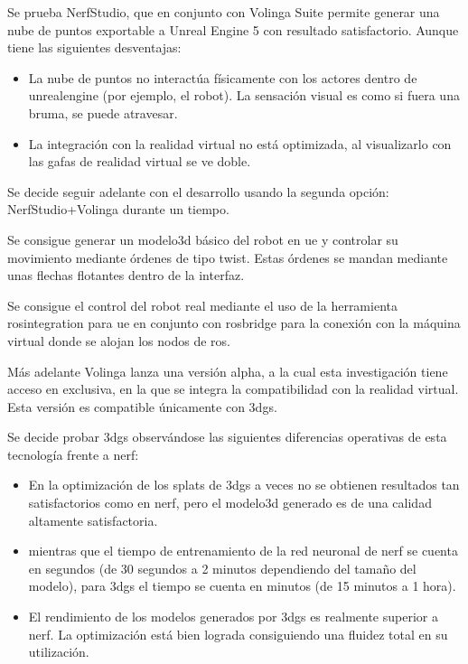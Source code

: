 \documentclass[a4paper, 12pt, spanish, twoside]{article}
\begin{document}
Se prueba NerfStudio, que en conjunto con Volinga Suite permite generar una nube de puntos exportable a Unreal Engine 5 con resultado satisfactorio. Aunque tiene las siguientes desventajas: 

\begin{itemize} 
\item La nube de puntos no interactúa físicamente con los \gls{actores} dentro de \gls{unrealengine} (por ejemplo, el robot). La sensación visual es como si fuera una bruma, se puede atravesar. 

\item La integración con la realidad virtual no está optimizada, al visualizarlo con las gafas de realidad virtual se ve doble. 
\end{itemize} 

Se decide seguir adelante con el desarrollo usando la segunda opción: NerfStudio+Volinga durante un tiempo. 

Se consigue generar un \gls{modelo3d} básico del robot en \acrshort{ue} y controlar su movimiento mediante órdenes de tipo \gls{twist}. Estas órdenes se mandan mediante unas flechas flotantes dentro de la interfaz. 

Se consigue el control del robot real mediante el uso de la herramienta \gls{rosintegration} para \acrshort{ue} en conjunto con \gls{rosbridge} para la conexión con la máquina virtual donde se alojan los nodos de \acrshort{ros}. 

Más adelante Volinga lanza una versión alpha, a la cual esta investigación tiene acceso en exclusiva, en la que se integra la compatibilidad con la realidad virtual. Esta versión es compatible únicamente con \acrshort{3dgs}. 

Se decide probar \acrshort{3dgs} observándose las siguientes diferencias operativas de esta tecnología frente a \acrshort{nerf}: 

\begin{itemize}
\item En la optimización de los splats de \acrshort{3dgs} a veces no se obtienen resultados tan satisfactorios como en \acrshort{nerf}, pero el \gls{modelo3d} generado es de una calidad altamente satisfactoria. 

\item mientras que el tiempo de entrenamiento de la red neuronal de \acrshort{nerf} se cuenta en segundos (de 30 segundos a 2 minutos dependiendo del tamaño del modelo), para \acrshort{3dgs} el tiempo se cuenta en minutos (de 15 minutos a 1 hora). 

\item El rendimiento de los modelos generados por \acrshort{3dgs} es realmente superior a \gls{nerf}. La optimización está bien lograda consiguiendo una fluidez total en su utilización. 
\end{itemize} 
\end{document}
